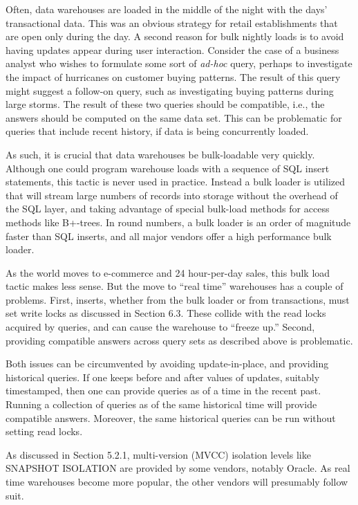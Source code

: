 \documentclass[b5paper,11pt,twoside,openright]{book}
\begin{document}
Often, data warehouses are loaded in the middle of the night with the
days' transactional data. This was an obvious strategy for retail
establishments that are open only during the day. A second reason for
bulk nightly loads is to avoid having updates appear during user
interaction. Consider the case of a business analyst who wishes to
formulate some sort of \emph{ad-hoc} query, perhaps to investigate the
impact of hurricanes on customer buying patterns. The result of this
query might suggest a follow-on query, such as investigating buying
patterns during large storms. The result of these two queries should be
compatible, i.e., the answers should be computed on the same data set.
This can be problematic for queries that include recent history, if data
is being concurrently loaded.

As such, it is crucial that data warehouses be bulk-loadable very
quickly. Although one could program warehouse loads with a sequence of
SQL insert statements, this tactic is never used in practice. Instead a
bulk loader is utilized that will stream large numbers of records into
storage without the overhead of the SQL layer, and taking advantage of
special bulk-load methods for access methods like B+-trees. In round
numbers, a bulk loader is an order of magnitude faster than SQL inserts,
and all major vendors offer a high performance bulk loader.

As the world moves to e-commerce and 24 hour-per-day sales, this bulk
load tactic makes less sense. But the move to ``real time'' warehouses
has a couple of problems. First, inserts, whether from the bulk loader
or from transactions, must set write locks as discussed in Section 6.3.
These collide with the read locks acquired by queries, and can cause the
warehouse to ``freeze up.'' Second, providing compatible answers across
query sets as described above is problematic.

Both issues can be circumvented by avoiding update-in-place, and
providing historical queries. If one keeps before and after values of
updates, suitably timestamped, then one can provide queries as of a time
in the recent past. Running a collection of queries as of the same
historical time will provide compatible answers. Moreover, the same
historical queries can be run without setting read locks.

As discussed in Section 5.2.1, multi-version (MVCC) isolation levels
like SNAPSHOT ISOLATION are provided by some vendors, notably Oracle. As
real time warehouses become more popular, the other vendors will
presumably follow suit.
\end{document}
